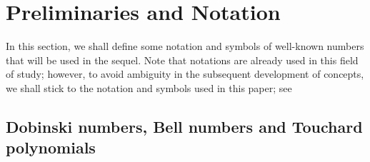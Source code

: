 \documentclass[pdflatex,sn-mathphys-num]{sn-jnl}%
\theoremstyle{thmstyleone}%
\theoremstyle{thmstyletwo}%
\theoremstyle{thmstylethree}%
\begin{document}



\section{Preliminaries and Notation}\label{Prelim}
In this section, we shall define some notation and symbols of well-known numbers that will be used in the sequel. Note that notations are already used in this field of study; however, to avoid ambiguity in the subsequent development of concepts, we shall stick to the notation and symbols used in this paper; see \cite{bell1934exponential,bell1938iterated,touchard1933proprietes}

\subsection{Dobinski numbers, Bell numbers and Touchard polynomials}
\end{document}
